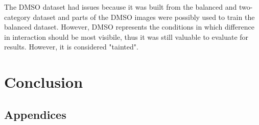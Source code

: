 \documentclass{l4proj}
\begin{document}
The DMSO dataset had issues because it was built from the balanced and two-category dataset and parts of the DMSO images were possibly used to train the balanced dataset. However, DMSO represents the conditions in which difference in interaction should be most visibile, thus it was still valuable to evaluate for results. However, it is considered "tainted".



\chapter{Conclusion}

%
%

\begin{appendices}

\chapter{Appendices}

\end{appendices}






\end{document}

